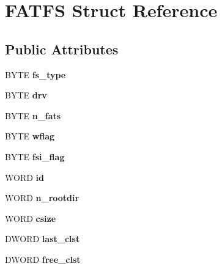 \hypertarget{struct_f_a_t_f_s}{}\section{F\+A\+T\+FS Struct Reference}
\label{struct_f_a_t_f_s}
\subsection*{Public Attributes}
\begin{DoxyCompactItemize}
\item 
\mbox{\label{struct_f_a_t_f_s_add27d97babe807b573eac98a71dc4ae5}} 
B\+Y\+TE {\bfseries fs\+\_\+type}
\item 
\mbox{\label{struct_f_a_t_f_s_a6a791560e2687e8b1569bfce61208d2d}} 
B\+Y\+TE {\bfseries drv}
\item 
\mbox{\label{struct_f_a_t_f_s_a56716c7e7ac10cf46e73ffb2a2e9b545}} 
B\+Y\+TE {\bfseries n\+\_\+fats}
\item 
\mbox{\label{struct_f_a_t_f_s_a647e43c9ccae94b7274793d1909897de}} 
B\+Y\+TE {\bfseries wflag}
\item 
\mbox{\label{struct_f_a_t_f_s_a84e9cdc5a6a8e33ea7ec192058abf161}} 
B\+Y\+TE {\bfseries fsi\+\_\+flag}
\item 
\mbox{\label{struct_f_a_t_f_s_a417095d7c20d56d417dc0998e0dd5a5c}} 
W\+O\+RD {\bfseries id}
\item 
\mbox{\label{struct_f_a_t_f_s_a189a00aa038044ffad0fc7f7dcf2aae1}} 
W\+O\+RD {\bfseries n\+\_\+rootdir}
\item 
\mbox{\label{struct_f_a_t_f_s_ad7fa7a509f8d097a9ab182d6c47be568}} 
W\+O\+RD {\bfseries csize}
\item 
\mbox{\label{struct_f_a_t_f_s_ac26e848817569fedc15a9a4e49ddedd1}} 
D\+W\+O\+RD {\bfseries last\+\_\+clst}
\item 
\mbox{\label{struct_f_a_t_f_s_ac834248773bf338df807f0d7e6b6a579}} 
D\+W\+O\+RD {\bfseries free\+\_\+clst}

\end{DoxyCompactItemize}
